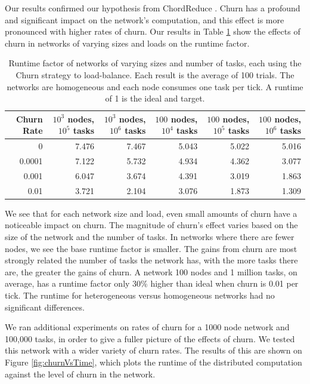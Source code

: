 Our results confirmed our hypothesis from ChordReduce \cite{chordreduce}.
Churn has a profound and significant impact on the network's computation, and this effect is more pronounced with higher rates of churn.
Our results in Table \ref{tab:ChurnRuntimesHomogenious} show the effects of churn in networks of varying sizes and loads on the runtime factor.


\begin{table}[h]
	\tiny
	\centering
	\caption[Churn Runtimes in a homogenious network]{Runtime factor of networks of varying sizes and number of tasks, each using the Churn strategy to load-balance.  Each result is the average of 100 trials. The networks are homogeneous and each node consumes one task per tick.  A runtime of 1 is the ideal and target.}
	\begin{tabular}{|r || r | r | r | r | r |}
		\hline
		Churn Rate & $ 10^{3}$ nodes, $ 10^{5}$ tasks & $ 10^{3}$ nodes, $ 10^{6}$ tasks & $ 100$ nodes, $ 10^{4}$ tasks & $ 100$ nodes, $ 10^{5}$ tasks &$ 100$ nodes, $ 10^{6}$ tasks \\ \hline
		0      & 7.476   &  7.467 &  5.043& 5.022 &5.016 \\\hline
		0.0001 & 7.122   &  5.732 &  4.934& 4.362&3.077 \\\hline
		0.001  & 6.047   &  3.674 &  4.391& 3.019  &1.863\\\hline
		0.01  &  3.721   &  2.104 &  3.076& 1.873 &1.309\\\hline
		
	\end{tabular}
	\label{tab:ChurnRuntimesHomogenious}
\end{table}

We see that for each network size and load, even small amounts of churn have a noticeable impact on churn.
The magnitude of churn's effect varies based on the size of the network and the number of tasks.
In networks where there are fewer nodes, we see the base runtime factor is smaller.
The gains from churn are most strongly related the number of tasks the network has, with the more tasks there are, the greater the gains of churn.
A network 100 nodes and 1 million tasks, on average, has a runtime factor only 30\% higher than ideal when churn is 0.01 per tick.
The runtime for heterogeneous versus homogeneous networks had no significant differences.


We ran additional experiments on rates of churn for a 1000 node network and 100,000 tasks, in order to give a fuller picture of the effects of churn.
We tested this network with a wider variety of churn rates.
The results of this are shown on Figure \ref{fig:churnVsTime}, which plots the runtime of the distributed computation against the level of churn in the network.


